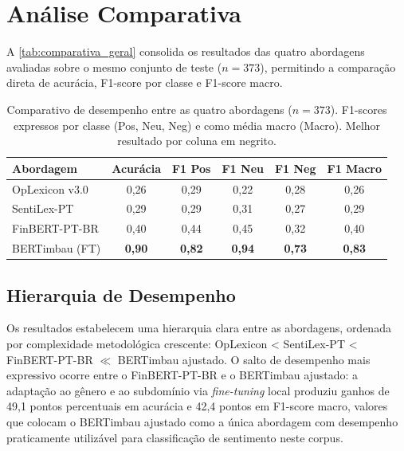
\section{Análise Comparativa}
\label{sec:analise_comparativa}

A \autoref{tab:comparativa_geral} consolida os resultados das quatro abordagens avaliadas sobre o mesmo conjunto de teste ($n = 373$), permitindo a comparação direta de acurácia, F1-score por classe e F1-score macro.

\begin{table}[!htbp]
	\caption[Comparativo de desempenho entre as abordagens]{Comparativo de desempenho entre as quatro abordagens ($n = 373$). F1-scores expressos por classe (Pos, Neu, Neg) e como média macro (Macro). Melhor resultado por coluna em negrito.}
	\label{tab:comparativa_geral}
	\centering
	\begin{tabular}{lccccc}
		\hline
		\textbf{Abordagem}  & \textbf{Acurácia} & \textbf{F1 Pos} & \textbf{F1 Neu} & \textbf{F1 Neg} & \textbf{F1 Macro} \\
		\hline
		OpLexicon v3.0      & 0,26              & 0,29            & 0,22            & 0,28            & 0,26              \\
		\hline
		SentiLex-PT         & 0,29              & 0,29            & 0,31            & 0,27            & 0,29              \\
		\hline
		FinBERT-PT-BR       & 0,40              & 0,44            & 0,45            & 0,32            & 0,40              \\
		\hline
		BERTimbau (FT)      & \textbf{0,90}     & \textbf{0,82}   & \textbf{0,94}   & \textbf{0,73}   & \textbf{0,83}     \\
		\hline
	\end{tabular}
\end{table}


\subsection{Hierarquia de Desempenho}
\label{subsec:hierarquia}

Os resultados estabelecem uma hierarquia clara entre as abordagens, ordenada por complexidade metodológica crescente: OpLexicon < SentiLex-PT < FinBERT-PT-BR $\ll$ BERTimbau ajustado. O salto de desempenho mais expressivo ocorre entre o FinBERT-PT-BR e o BERTimbau ajustado: a adaptação ao gênero e ao subdomínio via \textit{fine-tuning} local produziu ganhos de 49,1 pontos percentuais em acurácia e 42,4 pontos em F1-score macro, valores que colocam o BERTimbau ajustado como a única abordagem com desempenho praticamente utilizável para classificação de sentimento neste corpus.

